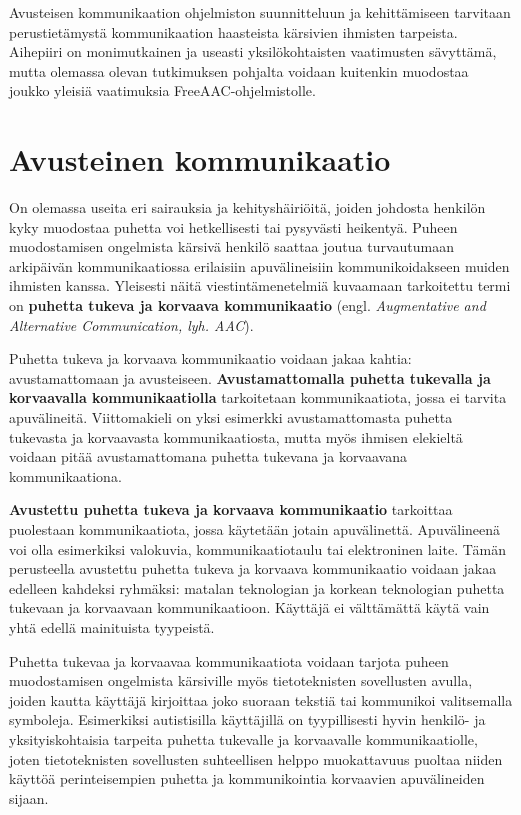\documentclass[utf8]{gradu3}
\begin{document}
Avusteisen kommunikaation ohjelmiston suunnitteluun ja kehittämiseen tarvitaan perustietämystä kommunikaation haasteista kärsivien ihmisten tarpeista. Aihepiiri on monimutkainen ja useasti yksilökohtaisten vaatimusten sävyttämä, mutta olemassa olevan tutkimuksen pohjalta voidaan kuitenkin muodostaa joukko yleisiä vaatimuksia FreeAAC-ohjelmistolle.

\section{Avusteinen kommunikaatio}

On olemassa useita eri sairauksia ja kehityshäiriöitä, joiden johdosta henkilön kyky muodostaa puhetta voi hetkellisesti tai pysyvästi heikentyä. Puheen muodostamisen ongelmista kärsivä henkilö saattaa joutua turvautumaan arkipäivän kommunikaatiossa erilaisiin apuvälineisiin kommunikoidakseen muiden ihmisten kanssa. Yleisesti näitä viestintämenetelmiä kuvaamaan tarkoitettu termi on \textbf{puhetta tukeva ja korvaava kommunikaatio} (engl. \textit{Augmentative and Alternative Communication, lyh. AAC}).

Puhetta tukeva ja korvaava kommunikaatio voidaan jakaa kahtia: avustamattomaan ja avusteiseen. \textbf{Avustamattomalla puhetta tukevalla ja korvaavalla kommunikaatiolla} tarkoitetaan kommunikaatiota, jossa ei tarvita apuvälineitä. Viittomakieli on yksi esimerkki avustamattomasta puhetta tukevasta ja korvaavasta kommunikaatiosta, mutta myös ihmisen elekieltä voidaan pitää avustamattomana puhetta tukevana ja korvaavana kommunikaationa. 

\textbf{Avustettu puhetta tukeva ja korvaava kommunikaatio} tarkoittaa puolestaan kommunikaatiota, jossa käytetään jotain apuvälinettä. Apuvälineenä voi olla esimerkiksi valokuvia, kommunikaatiotaulu tai elektroninen laite. Tämän perusteella avustettu puhetta tukeva ja korvaava kommunikaatio voidaan jakaa edelleen kahdeksi ryhmäksi: matalan teknologian ja korkean teknologian puhetta tukevaan ja korvaavaan kommunikaatioon. Käyttäjä ei välttämättä käytä vain yhtä edellä mainituista tyypeistä. \parencite[]{AAC-conditional-use}

Puhetta tukevaa ja korvaavaa kommunikaatiota voidaan tarjota puheen muodostamisen ongelmista kärsiville myös tietoteknisten sovellusten avulla, joiden kautta käyttäjä kirjoittaa joko suoraan tekstiä tai kommunikoi valitsemalla symboleja. Esimerkiksi autistisilla käyttäjillä on tyypillisesti hyvin henkilö- ja yksityiskohtaisia tarpeita puhetta tukevalle ja korvaavalle kommunikaatiolle, joten tietoteknisten sovellusten suhteellisen helppo muokattavuus puoltaa niiden käyttöä perinteisempien puhetta ja kommunikointia korvaavien apuvälineiden sijaan.
\end{document}
